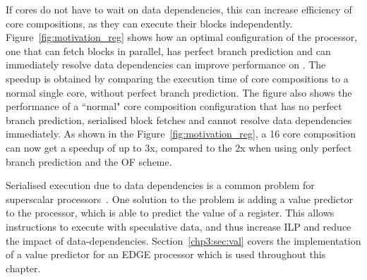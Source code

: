 If cores do not have to wait on data dependencies, this can increase efficiency of core compositions, as they can execute their blocks independently.
Figure~\ref{fig:motivation_reg} shows how an optimal configuration of the processor, one that can fetch blocks in parallel, has perfect branch prediction and can immediately resolve data dependencies can improve performance on .
The speedup is obtained by comparing the execution time of core compositions to a normal single core, without perfect branch prediction.
The figure also shows the performance of a ``normal" core composition configuration that has no perfect branch prediction, serialised block fetches and cannot resolve data dependencies immediately.
As shown in the Figure~\ref{fig:motivation_reg}, a 16 core composition can now get a speedup of up to 3x, compared to the 2x when using only perfect branch prediction and the OF scheme.

Serialised execution due to data dependencies is a common problem for superscalar processors~\cite{peraisVTAGE2014}.
One solution to the problem is adding a value predictor to the processor, which is able to predict the value of a register.
This allows instructions to execute with speculative data, and thus increase ILP and reduce the impact of data-dependencies.
Section~\ref{chp3:sec:val} covers the implementation of a value predictor for an EDGE processor which is used throughout this chapter.







